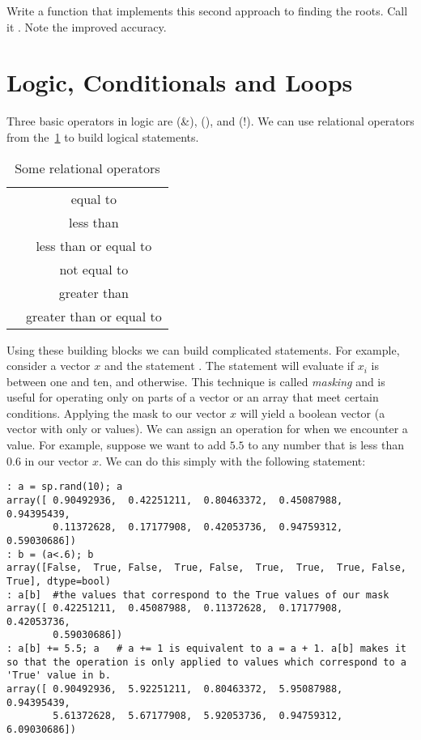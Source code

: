 \begin{problem}
Write a function that implements this second approach to finding the roots. Call it .  Note the improved accuracy.
\end{problem}

\section*{Logic, Conditionals and Loops}
Three basic operators in logic are  (\&),  (\textbar), and  (!). We can use relational operators from the~\ref{tbl:relops} to build logical statements.

\begin{table}[h!]
\begin{center}
\begin{tabular}{|c|c|}
	\hline
	\li{==} & equal to\\
        \li{<} & less than\\
	\li{<=} & less than or equal to\\
	\li{\!=} & not equal to\\
	\li{>} & greater than\\
	\li{>=} & greater than or equal to\\
	\hline
\end{tabular}
\caption{Some relational operators}
\label{tbl:relops}
\end{center}
\end{table}

Using these building blocks we can build complicated statements. For example, consider a vector $x$ and the statement .  The statement will evaluate  if $x_i$ is between one and ten, and  otherwise.  This technique is called \emph{masking} and is useful for operating only on parts of a vector or an array that meet certain conditions.  Applying the mask to our vector $x$ will yield a boolean vector (a vector with only  or  values).  We can assign an operation for when we encounter a  value.  For example, suppose we want to add $5.5$ to any number that is less than $0.6$ in our vector $x$.  We can do this simply with the following statement:
\begin{lstlisting}[style=python]
: a = sp.rand(10); a
array([ 0.90492936,  0.42251211,  0.80463372,  0.45087988,  0.94395439,
        0.11372628,  0.17177908,  0.42053736,  0.94759312,  0.59030686])
: b = (a<.6); b
array([False,  True, False,  True, False,  True,  True,  True, False,  True], dtype=bool)
: a[b]  #the values that correspond to the True values of our mask
array([ 0.42251211,  0.45087988,  0.11372628,  0.17177908,  0.42053736,
        0.59030686])
: a[b] += 5.5; a   # a += 1 is equivalent to a = a + 1. a[b] makes it so that the operation is only applied to values which correspond to a 'True' value in b.
array([ 0.90492936,  5.92251211,  0.80463372,  5.95087988,  0.94395439,
        5.61372628,  5.67177908,  5.92053736,  0.94759312,  6.09030686])
\end{lstlisting}

